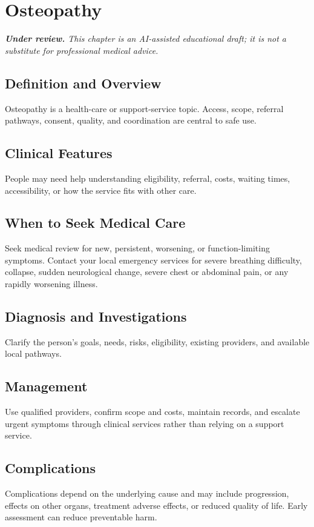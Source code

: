 \chapter{Osteopathy}

\medskip
\noindent\textit{\textbf{Under review.} This chapter is an AI-assisted educational draft; it is not a substitute for professional medical advice.}

\section*{Definition and Overview}
Osteopathy is a health-care or support-service topic. Access, scope, referral pathways, consent, quality, and coordination are central to safe use.

\section*{Clinical Features}
People may need help understanding eligibility, referral, costs, waiting times, accessibility, or how the service fits with other care.

\section*{When to Seek Medical Care}
Seek medical review for new, persistent, worsening, or function-limiting symptoms. Contact your local emergency services for severe breathing difficulty, collapse, sudden neurological change, severe chest or abdominal pain, or any rapidly worsening illness.

\section*{Diagnosis and Investigations}
Clarify the person's goals, needs, risks, eligibility, existing providers, and available local pathways.

\section*{Management}
Use qualified providers, confirm scope and costs, maintain records, and escalate urgent symptoms through clinical services rather than relying on a support service.

\section*{Complications}
Complications depend on the underlying cause and may include progression, effects on other organs, treatment adverse effects, or reduced quality of life. Early assessment can reduce preventable harm.

